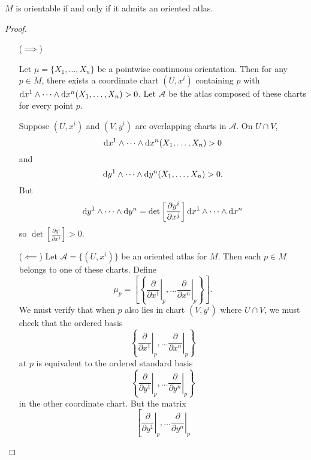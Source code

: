\begin{theorem}
$M$ is orientable if and only if it admits an oriented atlas.
\end{theorem}
\begin{proof}
  \begin{itemize}
    \item[($\implies$)]{
      Let $\mu = \{ X_1, \dots, X_n \}$ be a pointwise continuous
      orientation. Then for any $p \in M$, there exists a coordinate
      chart $(U, x^i)$ containing $p$ with
      $\mathop{}\!\mathrm{d} x^1 \wedge \cdots \wedge \mathop{}\!\mathrm{d} x^n(X_1, \dots, X_n) > 0$.
      Let $\mathcal{A}$ be the atlas composed of these charts for
      every point $p$.

      Suppose $(U, x^i)$ and $(V, y^i)$ are overlapping charts in
      $\mathcal{A}$. On $U \cap V$,
      $$
      \mathop{}\!\mathrm{d} x^1 \wedge \cdots \wedge \mathop{}\!\mathrm{d} x^n(X_1, \dots, X_n) > 0
      $$
      and
      $$
      \mathop{}\!\mathrm{d} y^1 \wedge \cdots \wedge \mathop{}\!\mathrm{d} y^n(X_1, \dots, X_n) > 0.
      $$
      But
      $$
        \mathop{}\!\mathrm{d} y^1 \wedge \cdots \wedge \mathop{}\!\mathrm{d} y^n
      = \det\left[\frac{\partial y^i}{\partial x^j}\right]
        \mathop{}\!\mathrm{d} x^1 \wedge \cdots \wedge \mathop{}\!\mathrm{d} x^n
      $$
      so $\det\left[\frac{\partial y^i}{\partial x^j}\right] > 0$.
    }
    \item[($\impliedby$)]{
      Let $\mathcal{A} = \{(U, x^i)\}$ be an oriented atlas for $M$.
      Then each $p \in M$ belongs to one of these charts. Define
      $$
        \mu_p
      = \left[
          \left\{
            \left.
              \frac{\partial}{\partial x^1}
            \right|_p,
            \dots
            \left.
              \frac{\partial}{\partial x^n}
            \right|_p
          \right\}
        \right].
      $$
      We must verify that when $p$ also lies in chart $(V, y^i)$ where
      $U \cap V$, we must check that the ordered basis
      $$
      \left\{
        \left.
          \frac{\partial}{\partial x^1}
        \right|_p,
        \dots
        \left.
          \frac{\partial}{\partial x^n}
        \right|_p
      \right\}
      $$
      at $p$ is
      equivalent to the ordered standard basis
      $$
      \left\{
        \left.
          \frac{\partial}{\partial y^1}
        \right|_p,
        \dots
        \left.
          \frac{\partial}{\partial y^n}
        \right|_p
      \right\}
      $$
      in the other coordinate chart. But the matrix
      $$
        \left[
          \left.
            \frac{\partial}{\partial y^1}
          \right|_p,
          \dots
          \left.
            \frac{\partial}{\partial y^n}
          \right|_p
$$}
\end{itemize}
\end{proof}
